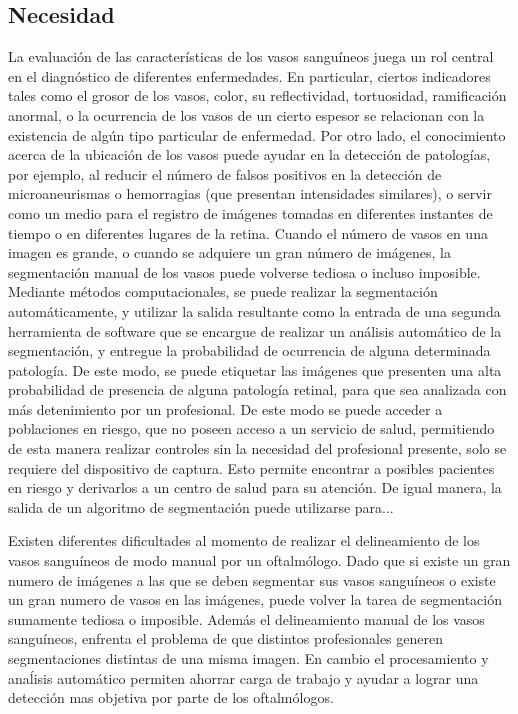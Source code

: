 \subsection{Necesidad}
La evaluaci\'on de las caracter\'isticas de los vasos sangu\'ineos  juega un  rol central en el diagn\'ostico de diferentes enfermedades. En particular, ciertos indicadores tales como el grosor de los vasos, color, su reflectividad, tortuosidad, ramificaci\'on anormal, o la ocurrencia de los vasos de un cierto espesor  se relacionan con la existencia de algún tipo particular de enfermedad.
Por otro lado, el conocimiento acerca de la ubicación de los vasos puede ayudar
en la detección de patologías, por ejemplo, al reducir el número de falsos positivos
en la detección de microaneurismas o hemorragias (que presentan intensidades similares), o servir como un medio para el registro de imágenes
tomadas en diferentes instantes de tiempo o en diferentes lugares de la retina.\cite{staal2004ridge}
Cuando el n\'umero de vasos en una imagen es grande, o cuando se adquiere un gran n\'umero de im\'agenes, la segmentaci\'on manual de los vasos puede volverse tediosa o incluso imposible. 
Mediante m\'etodos computacionales, se puede realizar la segmentación autom\'aticamente, y utilizar la salida resultante como la entrada de una segunda herramienta de software que se encargue de  realizar un an\'alisis autom\'atico de la segmentaci\'on, y entregue la probabilidad de ocurrencia de alguna determinada patolog\'ia. De este modo, se puede etiquetar las im\'agenes que presenten una alta  probabilidad de presencia de alguna patolog\'ia retinal, para que sea analizada con m\'as detenimiento por un profesional. De este modo se puede acceder a poblaciones en riesgo, que no poseen acceso a un servicio de salud, permitiendo de esta manera realizar controles sin la necesidad del profesional presente, solo se requiere del dispositivo de captura. Esto permite encontrar a posibles pacientes en riesgo y derivarlos a un centro de salud para su atenci\'on. De igual manera, la salida de un algoritmo de segmentaci\'on puede utilizarse para...


Existen diferentes dificultades al momento de realizar el delineamiento de los vasos sangu\'ineos de modo manual por un oftalm\'ologo. Dado que si existe un gran numero de im\'agenes a las que se deben segmentar sus vasos sangu\'ineos o existe un gran numero de vasos en las im\'agenes, puede volver la tarea de segmentaci\'on sumamente tediosa o imposible. Adem\'as el delineamiento manual de los vasos sangu\'ineos, enfrenta el problema de que distintos profesionales generen segmentaciones distintas de una misma imagen. En cambio el procesamiento y ana\'lisis autom\'atico permiten ahorrar carga de trabajo y ayudar a lograr una detecci\'on mas objetiva por parte de los oftalm\'ologos. 

